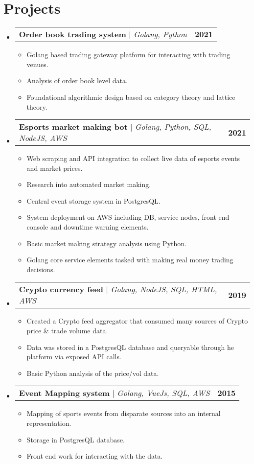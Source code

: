 \documentclass[letterpaper,11pt]{article}
\makeatletter
\newcommand{\resumeItem}[1]{
  \item\small{
    {#1 \vspace{-2pt}}
  }
}
\newcommand{\resumeProjectHeading}[2]{
    \item
    \begin{tabular*}{1.001\textwidth}{l@{\extracolsep{\fill}}r}
      \small#1 & \textbf{\small #2}\\
    \end{tabular*}\vspace{-7pt}
}
\newcommand{\resumeSubHeadingListStart}{\begin{itemize}[leftmargin=0.0in, label={}]}
\newcommand{\resumeSubHeadingListEnd}{\end{itemize}}
\newcommand{\resumeItemListStart}{\begin{itemize}}
\newcommand{\resumeItemListEnd}{\end{itemize}\vspace{-5pt}}
\makeatother
\begin{document}
\section{Projects}
    \vspace{-5pt}
    \resumeSubHeadingListStart
    
        \resumeProjectHeading
              {\textbf{Order book trading system} $|$ \emph{Golang, Python}}{2021}
              \resumeItemListStart
                \resumeItem{Golang based trading gateway platform for interacting with trading venues.}
                \resumeItem{Analysis of order book level data.}
                \resumeItem{Foundational algorithmic design based on category theory and lattice theory.}
              \resumeItemListEnd
              \vspace{-13pt}
    
        \resumeProjectHeading
          {\textbf{Esports market making bot} $|$ \emph{Golang, Python, SQL, NodeJS, AWS}}{2021}
          \resumeItemListStart
            \resumeItem{Web scraping and API integration to collect live data of esports events and market prices.}
            \resumeItem{Research into automated market making.}
            \resumeItem{Central event storage system in PostgresQL.}
            \resumeItem{System deployment on AWS including DB, service nodes, front end console and downtime warning elements.}
            \resumeItem{Basic market making strategy analysis using Python.}
            \resumeItem{Golang core service elements tasked with making real money trading decisions.}
          \resumeItemListEnd
          \vspace{-13pt}
          
      \resumeProjectHeading
          {\textbf{Crypto currency feed} $|$ \emph{Golang, NodeJS, SQL, HTML, AWS}}{2019}
          \resumeItemListStart
            \resumeItem{Created a Crypto feed aggregator that consumed many sources of Crypto price \& trade volume data.}
            \resumeItem{Data was stored in a PostgresQL database and queryable through he platform via exposed API calls.}
            \resumeItem{Basic Python analysis of the price/vol data.}
          \resumeItemListEnd 
          \vspace{-13pt}
          \resumeProjectHeading
          {\textbf{Event Mapping system} $|$ \emph{Golang, VueJs, SQL, AWS}}{2015}
          \resumeItemListStart
            \resumeItem{Mapping of sports events from disparate sources into an internal representation.}
            \resumeItem{Storage in PostgresQL database.}
            \resumeItem{Front end work for interacting with the data.}
          \resumeItemListEnd 
    \resumeSubHeadingListEnd
\vspace{-15pt}
\end{document}

